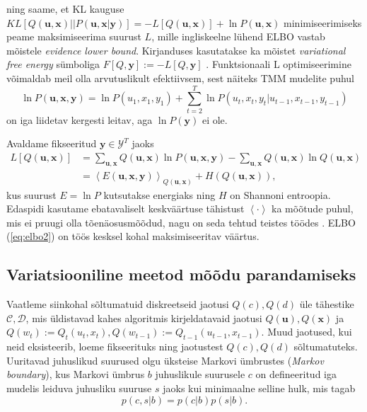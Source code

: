 ning saame, et KL kauguse $KL[Q(\bm{u}, \bm{x}) || P(\bm{u}, \bm{x} | \bm{y})] = -L[Q(\bm{u}, \bm{x})] + \ln P(\bm{u}, \bm{x})$ minimiseerimiseks peame maksimiseerima suurust $L$, mille ingliskeelne lühend ELBO vastab mõistele \textit{evidence lower bound}. Kirjanduses kasutatakse ka mõistet \textit{variational free energy} sümboliga $F[Q, \bm{y}] := -L[Q, \bm{y}]$ \parencite{Parr.2019}. Funktsionaali L optimiseerimine võimaldab meil olla arvutuslikult efektiivsem, sest näiteks TMM mudelite puhul 
$$\ln P(\bm{u}, \bm{x}, \bm{y}) = \ln P(u_1, x_1, y_1) + \sum_{t=2}^T \ln P(u_t, x_t, y_t | u_{t-1}, x_{t-1}, y_{t-1})$$
on iga liidetav kergesti leitav, aga $\ln P(\mathbf{y})$ ei ole.

Avaldame fikseeritud $\bm{y} \in \mathcal{Y}^T$ jaoks
\begin{align}
    \label{eq:elbo1}
    L[Q(\bm{u}, \bm{x})] &=\sum_{\bm{u}, \bm{x}} Q(\bm{u}, \bm{x}) \ln P(\bm{u}, \bm{x}, \bm{y}) - \sum_{\bm{u}, \bm{x}} Q(\bm{u}, \bm{x}) \ln Q(\bm{u}, \bm{x})\\
    \label{eq:elbo2}
    &= \left< E(\bm{u}, \bm{x},\bm{y}) \right>_{Q(\bm{u}, \bm{x})} + H(Q(\bm{u}, \bm{x})),
\end{align}
kus suurust $E = \ln P$ kutsutakse energiaks ning $H$ on Shannoni entroopia. Edaspidi kasutame ebatavaliselt keskväärtuse tähistust $\left<  \cdot \right>$ ka mõõtude puhul, mis ei pruugi olla tõenäosusmõõdud, nagu on seda tehtud teistes töödes \parencite{Parr.2019}. ELBO (\ref{eq:elbo2}) on töös kesksel kohal maksimiseeritav väärtus.

\subsection{Variatsiooniline meetod mõõdu parandamiseks}

Vaatleme siinkohal sõltumatuid diskreetseid jaotusi $Q(c),Q(d)$ üle tähestike $\mathcal{C}, \mathcal{D}$, mis üldistavad kahes algoritmis kirjeldatavaid jaotusi $Q(\mathbf{u}),Q(\mathbf{x})$ ja $Q(w_t):=Q_t(u_t,x_t),Q(w_{t-1}):=Q_{t-1}(u_{t-1},x_{t-1})$. Muud jaotused, kui neid eksisteerib, loeme fikseerituks ning jaotustest $Q(c), Q(d)$ sõltumatuteks. Uuritavad juhuslikud suurused olgu üksteise Markovi ümbrustes (\textit{Markov boundary}), kus Markovi ümbrus $b$ juhuslikule suurusele $c$ on defineeritud \parencite{Parr.2022} iga mudelis leiduva juhusliku suuruse $s$ jaoks kui minimaalne selline hulk, mis tagab
\begin{equation}
    \label{eq:markov_blanket}
    p(c,s|b) = p(c|b)p(s|b).
\end{equation}

